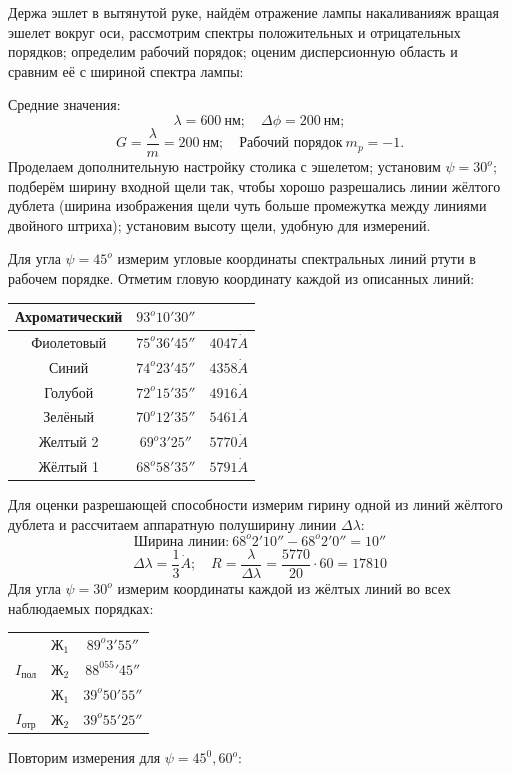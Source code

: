 \documentclass[10pt, a4paper]{article}
\begin{document}
Держа эшлет в вытянутой руке, найдём отражение лампы накаливанияж вращая эшелет вокруг оси, рассмотрим спектры положительных и отрицательных порядков; определим рабочий порядок; оценим дисперсионную область и сравним её с шириной спектра лампы:

\noindent
Средние значения:
\[
	\lambda = 600\ нм; \quad \Delta \phi = 200\ нм;
\]
\[
	G = \frac{\lambda}{m} = 200\ нм; \quad \text{Рабочий порядок}\ m_p = -1.
\]
Проделаем дополнительную настройку столика с эшелетом; установим $\psi = 30^o$; подберём ширину входной щели так, чтобы хорошо разрешались линии жёлтого дублета (ширина изображения щели чуть больше промежутка между линиями двойного штриха); установим высоту щели, удобную для измерений.

Для угла $\psi = 45^o$ измерим угловые координаты спектральных линий ртути в рабочем порядке. Отметим гловую координату каждой из описанных линий:
\begin{table}[H]
	\centering
	\begin{tabular}{|c|c|c|}  \hline
	Ахроматический & $93^o 10' 30''$ & {} \\\hline
	Фиолетовый & $75^o 36' 45''$ & $4047 \dot A$ \\\hline
	Синий & $74^o 23' 45''$ & $4358 \dot A$ \\\hline
	Голубой & $72^o15'35''$ & $4916 \dot A$ \\\hline
 	Зелёный & $70^o12'35''$ & $5461 \dot A$ \\\hline
	Желтый 2 & $69^o 3' 25''$ & $5770 \dot A$ \\\hline
	Жёлтый 1 & $68^o 58'35''$ & $5791 \dot A$ \\\hline
	\end{tabular}
	\end{table}
	Для оценки разрешающей способности измерим гирину одной из линий жёлтого дублета и рассчитаем аппаратную полуширину линии $\Delta \lambda$:
	\[
	\text{Ширина линии:}\ 68^o2'10'' - 68^o2'0'' = 10'' 
	\]
	\[
	\Delta \lambda = \frac{1}{3} \dot A; \quad R = \frac{\lambda}{\Delta \lambda} =\frac{5770}{20} \cdot 60 =  17810
	\]
	Для угла $\psi = 30^o$ измерим координаты каждой из жёлтых линий во всех наблюдаемых порядках:
\begin{table}[H]
\begin{center}
\begin{tabular}{|c|c|c|} \hline
& $Ж_1$ & $89^o3'55''$ \\
\cline{2-3}
$I_{пол}$
& $Ж_2$ & $88^055'45''$ \\\hline
& $Ж_1$ & $39^o50'55''$ \\
\cline{2-3}
$I_{отр}$
& $Ж_2$ & $39^o55'25''$ \\\hline
\end{tabular}
\end{center}
\end{table}
Повторим измерения для $\psi = 45^0, 60^o$:
\end{document}
